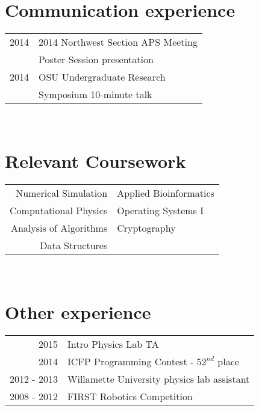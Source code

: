 \documentclass[10pt]{article} %
\begin{document}
{\begin{minipage}[t]{0.44\textwidth}

\section{Communication experience} 

\begin{tabular}{rl}
  2014 & 2014 Northwest Section APS Meeting\\
  & Poster Session presentation\\
  2014 & OSU Undergraduate Research\\
  & Symposium 10-minute talk\\
\end{tabular} \\


\section{Relevant Coursework} 

\begin{tabular}{rl}
  Numerical Simulation & Applied Bioinformatics\\
  Computational Physics & Operating Systems I\\
  Analysis of Algorithms & Cryptography\\
  Data Structures &\\
\end{tabular} \\



\section{Other experience} 

\begin{tabular}{rl}
  2015 & Intro Physics Lab TA\\
  2014 & ICFP Programming Contest - $52^{nd}$ place\\
  2012 - 2013 & Willamette University physics lab assistant \\
  2008 - 2012 & FIRST Robotics Competition \\ 
\end{tabular} \\


\end{minipage}}
\end{document}

